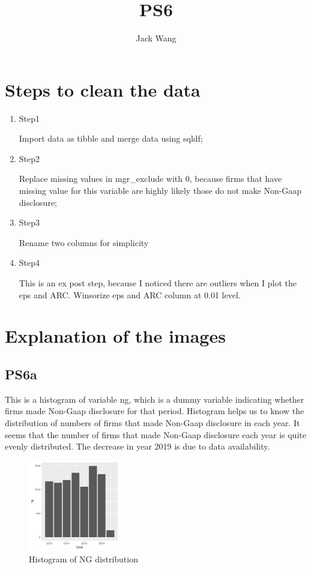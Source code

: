 \documentclass{article}
\title{PS6}
\author{Jack Wang}
\begin{document}
\maketitle



\section{Steps to clean the data}
\begin{enumerate}
\item Step1

Import data as tibble and merge data using sqldf;

\item Step2

Replace missing values in mgr\_exclude with 0, because firms that have missing value for this variable are highly likely those do not make Non-Gaap disclosure;

\item Step3

Rename two columns for simplicity

\item Step4

This is an ex post step, because I noticed there are outliers when I plot the eps and ARC. Winsorize eps and ARC column at 0.01 level.

\end{enumerate}


\section{Explanation of the images}

\subsection{PS6a}
This is a histogram of variable ng, which is a dummy variable indicating whether firms made Non-Gaap disclosure for that period. Histogram helps us to know the distribution of numbers of firms that made Non-Gaap disclosure in each year. It seems that the number of firms that made Non-Gaap disclosure each year is quite evenly distributed. The decrease in year 2019 is due to data availability. 
\begin{figure}[htp]
    \centering
    \includegraphics[width=4cm]{PS6a_Wang.png}
    \caption{Histogram of NG distribution}
    \label{fig:hist}
\end{figure}
\end{document}
